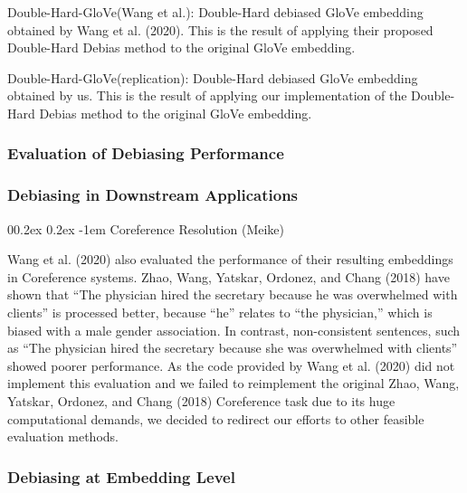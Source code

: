\documentclass[
  english,
  man,floatsintext]{apa6}
\makeatletter
\let\oldparagraph\paragraph
\renewcommand{\paragraph}[1]{\oldparagraph{#1}\mbox{}}
\renewcommand{\paragraph}{\@startsection{paragraph}{4}{\parindent}%
  {0\baselineskip \@plus 0.2ex \@minus 0.2ex}%
  {-1em}%
  {\normalfont\normalsize\bfseries\itshape\typesectitle}}
\makeatother
\begin{document}
Double-Hard-GloVe(Wang et al.): Double-Hard debiased GloVe embedding obtained by Wang et al. (2020). This is the result of applying their proposed Double-Hard Debias method to the original GloVe embedding.

Double-Hard-GloVe(replication): Double-Hard debiased GloVe embedding obtained by us. This is the result of applying our implementation of the Double-Hard Debias method to the original GloVe embedding.

\hypertarget{evaluation-of-debiasing-performance}{%
\subsubsection{Evaluation of Debiasing Performance}\label{evaluation-of-debiasing-performance}}

\hypertarget{debiasing-in-downstream-applications}{%
\subsubsection{Debiasing in Downstream Applications}\label{debiasing-in-downstream-applications}}

\hypertarget{coreference-resolution-meike}{%
\paragraph{Coreference Resolution (Meike)}\label{coreference-resolution-meike}}

Wang et al. (2020) also evaluated the performance of their resulting embeddings in Coreference systems. Zhao, Wang, Yatskar, Ordonez, and Chang (2018) have shown that ``The physician hired the secretary because he was overwhelmed with clients'' is processed better, because ``he'' relates to ``the physician,'' which is biased with a male gender association. In contrast, non-consistent sentences, such as ``The physician hired the secretary because she was overwhelmed with clients'' showed poorer performance.
As the code provided by Wang et al. (2020) did not implement this evaluation and we failed to reimplement the original Zhao, Wang, Yatskar, Ordonez, and Chang (2018) Coreference task due to its huge computational demands, we decided to redirect our efforts to other feasible evaluation methods.

\hypertarget{debiasing-at-embedding-level}{%
\subsubsection{Debiasing at Embedding Level}\label{debiasing-at-embedding-level}}
\end{document}
